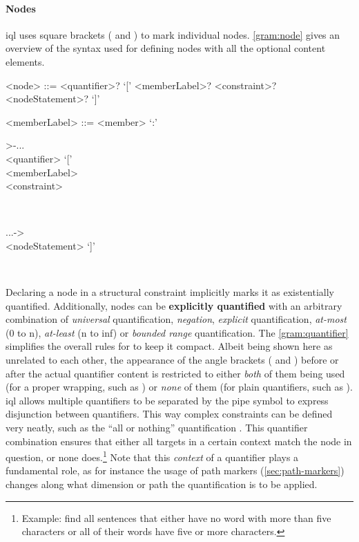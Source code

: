 \documentclass[11pt,a4paper]{article}
\begin{document}
\paragraph{Nodes}
\noindent \ac{iql} uses square brackets (\lit{[} and \lit{]}) to mark individual nodes.
\cref{gram:node} gives an overview of the syntax used for defining nodes with all the optional content elements.
\begin{gram}
	\label{gram:node}
	\begin{grammar}			
		<node> ::= <quantifier>? `[' <memberLabel>? <constraint>? <nodeStatement>? `]'
		
		<memberLabel> ::= <member> `:'
	\end{grammar}
	\diagsep
	\noindent\begin{rrfrag}{>-}{...}
		\sst \\ <quantifier> \est `[' 
		\sst \\ <memberLabel> \est
		\sst \\ <constraint> \est
	\end{rrfrag}\\
	\begin{rrfrag}{...}{->}
		\sst \\ <nodeStatement> \est `]'
	\end{rrfrag}\\
\end{gram}
Declaring a node in a structural constraint implicitly marks it as existentially quantified.
Additionally, nodes can be \textbf{explicitly quantified} with an arbitrary combination of \textit{universal} quantification, \textit{negation}, \textit{explicit} quantification, \textit{at-most} (0 to n), \textit{at-least} (n to inf) or \textit{bounded range} quantification. 
The \cref{gram:quantifier} simplifies the overall rules for  to keep it compact.
Albeit being shown here as unrelated to each other, the appearance of the angle brackets (\lit{\textless} and \lit{\textgreater}) before or after the actual quantifier content is restricted to either \textit{both} of them being used (for a proper wrapping, such as ) or \textit{none} of them (for plain quantifiers, such as ).
\ac{iql} allows multiple quantifiers to be separated by the pipe symbol \lit{|} to express disjunction between quantifiers.
This way complex constraints can be defined very neatly, such as the ``all or nothing'' quantification .
This quantifier combination ensures that either all targets in a certain context match the node in question, or none does.\footnote{Example: find all sentences that either have no word with more than five characters or all of their words have five or more characters.}
Note that this \textit{context} of a quantifier plays a fundamental role, as for instance the usage of path markers (\ref{sec:path-markers}) changes along what dimension or path the quantification is to be applied.
\end{document}
